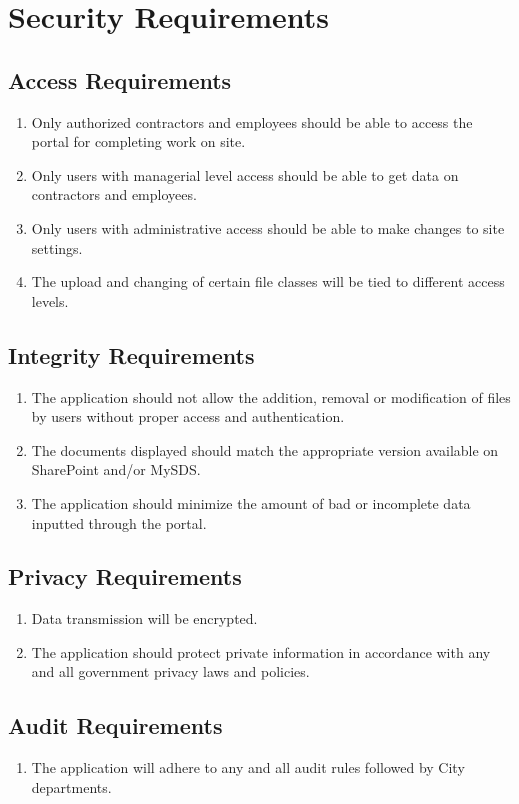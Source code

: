 \documentclass[12pt]{article}
\begin{document}
\section{Security Requirements}
\subsection{Access Requirements}
\begin{enumerate} [{SR-AR}1.]
  \item Only authorized contractors and employees should be able to access the
    portal for completing work on site.
  \item Only users with managerial level access should be able to get data on
    contractors and employees.
  \item Only users with administrative access should be able to make changes to
    site settings.
  \item The upload and changing of certain file classes will be tied to
    different access levels.
\end{enumerate}
\subsection{Integrity Requirements}
\begin{enumerate} [{SR-IR}1.]
  \item The application should not allow the addition, removal or modification
    of files by users without proper access and authentication.
  \item The documents displayed should match the appropriate version available
    on SharePoint and/or MySDS.
  \item The application should minimize the amount of bad or incomplete data
    inputted through the portal.
\end{enumerate}
\subsection{Privacy Requirements}
\begin{enumerate} [{SR-PR}1.]
  \item Data transmission will be encrypted.
  \item The application should protect private information in accordance with
    any and all government privacy laws and policies.
\end{enumerate}
\subsection{Audit Requirements}
\begin{enumerate} [{SR-AU}1.]
  \item The application will adhere to any and all audit rules followed by City
    departments.
\end{enumerate}
\end{document}
